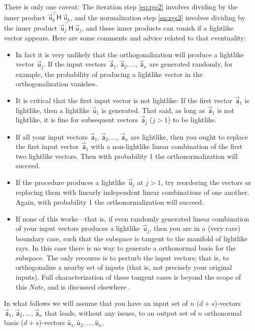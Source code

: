 \documentclass{article}
\newcommand{\metric}{\mathsf{H}}
\newcommand\upvec[1]{\!\vec{\,\mathrm{#1}}}
\newcommand{\Lvec}[1]{\upvec{\mathsf{#1}}} %
\newcommand{\Lhat}[1]{\hat{\mathsf{#1}}} %
\newcommand{\plus}{\!+\!} %
\newcommand{\documentname}{\textsl{Note}}
\begin{document}
There is only one caveat:
The iteration step \eqref{eq:rgs2} involves dividing by the inner product $\Lvec{u}_k^\top\metric\,\Lvec{u}_k$, and the normalization step \eqref{eq:rgs3} involves dividing by the inner product $\Lvec{u}_j^\top\metric\,\Lvec{u}_j$, and these inner products can vanish if a lightlike vector appears.
Here are some comments and advice related to that eventuality:
\begin{itemize}
\item In fact it is very unlikely that the orthogonalization will produce a lightlike vector $\Lvec{u}_j$.
If the input vectors $\Lvec{a}_1,\Lvec{a}_2,\ldots,\Lvec{a}_n$ are generated randomly, for example, the probability of producing a lightlike vector in the orthogonalization vanishes.
\item It is critical that the first input vector is not lightlike: If the first vector $\Lvec{a}_1$ is lightlike, then a lightlike $\Lvec{u}_1$ is generated.
That said, as long as $\Lvec{a}_1$ is not lightlike, it is fine for subsequent vectors $\Lvec{a}_j$ ($j>1$) to be lightlike.
\item If all your input vectors $\Lvec{a}_1,\Lvec{a}_2,\ldots,\Lvec{a}_n$ are lightlike, then you ought to replace the first input vector $\Lvec{a}_1$ with a non-lightlike linear combination of the first two lightlike vectors.
Then with probability 1 the orthonormalization will succeed.
\item If the procedure produces a lightlike $\Lvec{u}_j$ at $j>1$, try reordering the vectors or replacing them with linearly independent linear combinations of one another.
Again, with probability 1 the orthonormalization will succeed.
\item If none of this works---that is, if even randomly generated linear combination of your input vectors produces a lightlike $\Lvec{u}_j$, then you are in a (very rare) boundary case, such that the subspace is tangent to the manifold of lightlike rays.
In this case there is no way to generate a orthonormal basis for the subspace.
The only recourse is to perturb the input vectors; that is, to orthogonalize a nearby set of inputs (that is, not precisely your original inputs).
Full characterization of these tangent cases is beyond the scope of this \documentname, and is discussed elsewhere \cite{tangentspaces}.
\end{itemize}
In what follows we will assume that you have an input set of $n$ ($d\plus s$)-vectors $\Lvec{a}_1,\Lvec{a}_2,\ldots,\Lvec{a}_n$ that leads, without any issues, to an output set of $n$ orthonormal basis ($d\plus s$)-vectors $\Lhat{u}_1,\Lhat{u}_2,\ldots,\Lhat{u}_n$.
\end{document}
